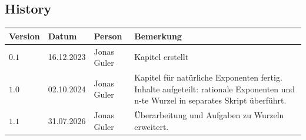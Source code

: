 \documentclass[11pt,oneside]{article}
\begin{document}
\newpage
\subsection*{History}
\begin{table}[H]
    \centering
    \begin{tabular}{|p{13mm}|p{20mm}|p{30mm}|p{70mm}|}\hline
        Version & Datum & Person & Bemerkung \\\hline
        $0.1$ & 16.12.2023 & Jonas Guler & Kapitel erstellt \\\hline
        $1.0$ & 02.10.2024 & Jonas Guler & Kapitel für natürliche Exponenten fertig. Inhalte aufgeteilt: rationale Exponenten und n-te Wurzel in separates Skript überführt.\\\hline
        $1.1$ & 31.07.2026 & Jonas Guler & Überarbeitung und Aufgaben zu Wurzeln erweitert. \\\hline
    \end{tabular}
\end{table}
\end{document}
